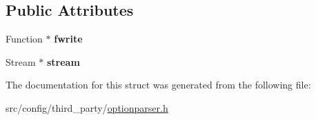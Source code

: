 \subsection*{Public Attributes}
\begin{DoxyCompactItemize}
\item 
\hypertarget{structxmem_1_1config_1_1third__party_1_1_print_usage_implementation_1_1_stream_writer_acf48d2de031f76c609ab518fc757cfc1}{}Function $\ast$ {\bfseries fwrite}\label{structxmem_1_1config_1_1third__party_1_1_print_usage_implementation_1_1_stream_writer_acf48d2de031f76c609ab518fc757cfc1}

\item 
\hypertarget{structxmem_1_1config_1_1third__party_1_1_print_usage_implementation_1_1_stream_writer_ad0c294cda61db3cc2f7776def7466217}{}Stream $\ast$ {\bfseries stream}\label{structxmem_1_1config_1_1third__party_1_1_print_usage_implementation_1_1_stream_writer_ad0c294cda61db3cc2f7776def7466217}

\end{DoxyCompactItemize}


The documentation for this struct was generated from the following file\+:\begin{DoxyCompactItemize}
\item 
src/config/third\+\_\+party/\hyperlink{optionparser_8h}{optionparser.\+h}\end{DoxyCompactItemize}
